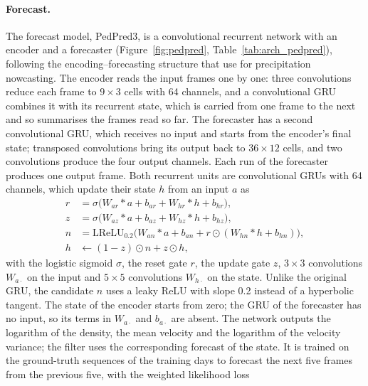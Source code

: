 \documentclass[english, 12pt, a4paper, elec, utf8, a-2b, online]{aaltothesis}
\begin{document}
\paragraph{Forecast.}
The forecast model, PedPred3, is a convolutional recurrent network with an
encoder and a forecaster (Figure~\ref{fig:pedpred},
Table~\ref{tab:arch_pedpred}), following the encoding--forecasting structure that
\citeauthor{shi2017nowcasting} \cite{shi2015convlstm, shi2017nowcasting} use for
precipitation nowcasting. The encoder reads the input frames one by one:
three convolutions reduce each frame to $9 \times 3$ cells with 64 channels,
and a convolutional GRU combines it with its recurrent state, which is carried
from one frame to the next and so summarises the frames read so far. The
forecaster has a second convolutional GRU, which receives no input and starts
from the encoder's final state; transposed convolutions bring its output back
to $36 \times 12$ cells, and two convolutions produce the four output
channels. Each run of the forecaster produces one output frame. Both recurrent
units are convolutional GRUs \cite{cho2014gru} with 64 channels, which update
their state $h$ from an input $a$ as
\begin{equation}
	\begin{aligned}
	r &= \sigma\big(W_{ar} \ast a + b_{ar} + W_{hr} \ast h + b_{hr}\big), \\
	z &= \sigma\big(W_{az} \ast a + b_{az} + W_{hz} \ast h + b_{hz}\big), \\
	n &= \mathrm{LReLU}_{0.2}\big(W_{an} \ast a + b_{an} + r \odot (W_{hn} \ast h + b_{hn})\big), \\
	h &\leftarrow (1 - z) \odot n + z \odot h,
	\end{aligned}
	\label{eq:convgru}
\end{equation}
with the logistic sigmoid $\sigma$, the reset gate $r$, the update gate $z$, $3 \times 3$ convolutions $W_{a\cdot}$ on
the input and $5 \times 5$ convolutions $W_{h\cdot}$ on the state. Unlike the original
GRU, the candidate $n$ uses a leaky ReLU with slope 0.2 instead of a hyperbolic
tangent. The state of the encoder starts from zero; the GRU of the forecaster has
no input, so its terms in $W_{a\cdot}$ and $b_{a\cdot}$ are absent. The network outputs the
logarithm of the density, the mean velocity and the logarithm of the velocity
variance; the filter uses the corresponding forecast of the state. It is trained
on the ground-truth sequences of the training days to forecast the next five
frames from the previous five, with the weighted likelihood loss
\end{document}
